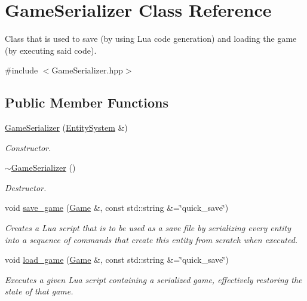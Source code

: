 \hypertarget{class_game_serializer}{}\section{Game\+Serializer Class Reference}
\label{class_game_serializer}


Class that is used to save (by using Lua code generation) and loading the game (by executing said code).  




{\ttfamily \#include $<$Game\+Serializer.\+hpp$>$}

\subsection*{Public Member Functions}
\begin{DoxyCompactItemize}
\item 
\hyperlink{class_game_serializer_a2729d91f839374a45ffb009db9bf7da3}{Game\+Serializer} (\hyperlink{class_entity_system}{Entity\+System} \&)
\begin{DoxyCompactList}\small\item\em Constructor. \end{DoxyCompactList}\item 
\hyperlink{class_game_serializer_abff94e1ff460d5793747a662ffd08851}{$\sim$\+Game\+Serializer} ()
\begin{DoxyCompactList}\small\item\em Destructor. \end{DoxyCompactList}\item 
void \hyperlink{class_game_serializer_aa57bfc3a1490bbbf73c75daa5ab06644}{save\+\_\+game} (\hyperlink{class_game}{Game} \&, const std\+::string \&=\char`\"{}quick\+\_\+save\char`\"{})
\begin{DoxyCompactList}\small\item\em Creates a Lua script that is to be used as a save file by serializing every entity into a sequence of commands that create this entity from scratch when executed. \end{DoxyCompactList}\item 
void \hyperlink{class_game_serializer_a4f1a6c9202608b390c15c25efc6f2987}{load\+\_\+game} (\hyperlink{class_game}{Game} \&, const std\+::string \&=\char`\"{}quick\+\_\+save\char`\"{})
\begin{DoxyCompactList}\small\item\em Executes a given Lua script containing a serialized game, effectively restoring the state of that game. \end{DoxyCompactList}\end{DoxyCompactItemize}
